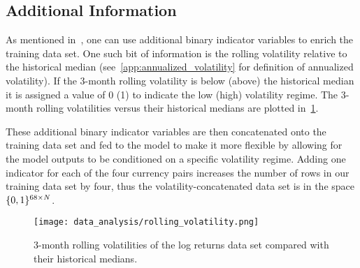 \subsection{Additional Information}
As mentioned in~\cite{kondratyev_2019}, one can use additional binary indicator variables to enrich the training data set.
One such bit of information is the rolling volatility relative to the historical median (see~\cref{app:annualized_volatility} for definition of annualized volatility).
If the 3-month rolling volatility is below (above) the historical median it is assigned a value of 0 (1) to indicate the low (high) volatility regime.
The 3-month rolling volatilities versus their historical medians are plotted in~\cref{fig:rolling_volatility}.

These additional binary indicator variables are then concatenated onto the training data set and fed to the model to make it more flexible by allowing for the model outputs to be conditioned on a specific volatility regime.
Adding one indicator for each of the four currency pairs increases the number of rows in our training data set by four, thus the volatility-concatenated data set is in the space \( \{0,1\}^{68 \times N} \).

\begin{figure}[!htb]
    \begin{center}
        \texttt{[image: data\_analysis/rolling\_volatility.png]}
    \end{center}
    \caption{3-month rolling volatilities of the log returns data set compared with their historical medians.}
    \label{fig:rolling_volatility}
\end{figure}
